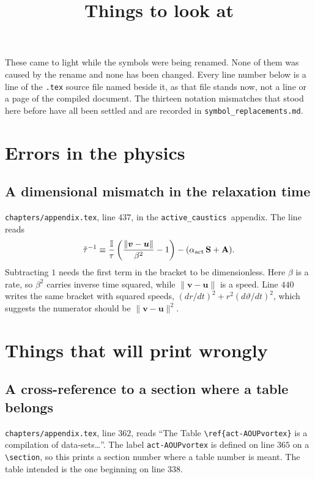 \documentclass[11pt,a4paper]{article}
\title{Things to look at}
\author{}
\date{}
\newcommand{\mb}[1]{\mathbb{#1}}
\renewcommand{\vec}[1]{\boldsymbol{#1}}
\newcommand{\actc}{\texttt{active\_caustics}}
\newcommand{\apdx}{\texttt{chapters/appendix.tex}}
\begin{document}
\maketitle

These came to light while the symbols were being renamed. None of them was caused
by the rename and none has been changed. Every line number below is a line of the
\texttt{.tex} source file named beside it, as that file stands now, not a line
or a page of the compiled document. The thirteen notation mismatches that stood
here before have all been settled and are recorded in
\texttt{symbol\_replacements.md}.

\section{Errors in the physics}

\subsection{A dimensional mismatch in the relaxation time}
\apdx, line $437$, in the \actc\ appendix. The line reads
\begin{equation*}
  \tilde{\tau}^{-1} \equiv \frac{\mb{I}}{\tau}
  \left(\frac{\lVert\vec{v}-\vec{u}\rVert}{\beta^{2}} - 1\right)
  - (\alpha_{\rm act}\,\mathbf{S} + \mathbf{A}) .
\end{equation*}
Subtracting $1$ needs the first term in the bracket to be dimensionless. Here
$\beta$ is a rate, so $\beta^2$ carries inverse time squared, while
$\lVert\vec{v}-\vec{u}\rVert$ is a speed. Line $440$ writes the same bracket with
squared speeds, $(dr/dt)^2 + r^2(d\vartheta/dt)^2$, which suggests the numerator
should be $\lVert\vec{v}-\vec{u}\rVert^2$.




\section{Things that will print wrongly}




\subsection{A cross-reference to a section where a table belongs}
\apdx, line $362$, reads ``The Table \verb|\ref{act-AOUPvortex}| is a compilation
of data-sets\ldots''. The label \texttt{act-AOUPvortex} is defined on line $365$
on a \verb|\section|, so this prints a section number where a table number is
meant. The table intended is the one beginning on line $338$.
\end{document}
